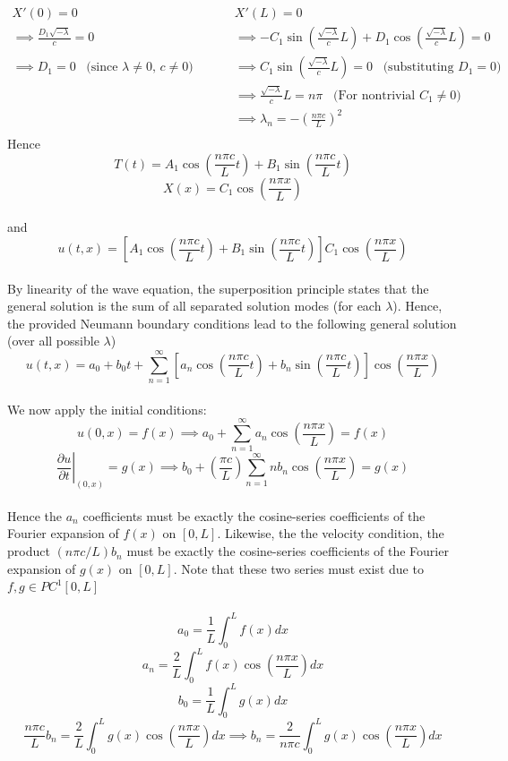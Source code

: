 \documentclass[12pt]{article}
\begin{document}
{\begin{align*}
X'(0) = 0 \;\;\;\;\;\;\;\;\;& X'(L) = 0 \\
\implies \frac{D_1 \sqrt{-\lambda}}{c} = 0\;\;\;\;\;\;\;\;\;& \implies -C_1 \sin\left( \frac{\sqrt{-\lambda}}{c} L \right) + D_1 \cos \left( \frac{\sqrt{-\lambda}}{c} L \right) = 0\\
\implies D_1 = 0 \;\;\; \text{(since $\lambda \neq 0$, $c \neq 0$)}\;\;\;\;\;\;\;\;\;& \implies C_1 \sin\left( \frac{\sqrt{-\lambda}}{c} L \right) = 0 \;\;\; \text{(substituting $D_1 = 0$)}  \\
\;\;\;\;\;\;\;\;\;& \implies \frac{\sqrt{-\lambda}}{c} L = n\pi \;\;\; \text{(For nontrivial $C_1 \neq 0$)}  \\
\;\;\;\;\;\;\;\;\;& \implies \lambda_n = - \left( \frac{n\pi c}{L} \right) ^2 \\
\end{align*}
Hence $$T(t) = A_1 \cos \left( \frac{n\pi c}{L} t \right) + B_1 \sin \left( \frac{n \pi c}{L} t \right)$$
$$X(x) = C_1 \cos \left( \frac{n\pi x}{L} \right)$$ \\ and 
$$u(t,x) = \left[ A_1 \cos \left( \frac{n\pi c}{L} t \right) + B_1 \sin \left( \frac{n \pi c}{L} t \right) \right] C_1 \cos \left( \frac{n\pi x}{L} \right)$$ \\ 
By linearity of the wave equation, the superposition principle states that the general solution is the sum of all separated solution modes (for each $\lambda$). Hence, the provided Neumann boundary conditions lead to the following general solution (over all possible $\lambda$)\\
$$\boxed{u(t,x) = a_0 + b_0 t + \sum_{n=1}^{\infty} \left[ a_n \cos \left( \frac{n\pi c}{L} t \right) + b_n \sin \left( \frac{n \pi c}{L} t \right) \right]  \cos \left( \frac{n\pi x}{L} \right)} $$ \\
We now apply the initial conditions:
$$u(0,x) = f(x) \implies  a_0  + \sum_{n=1}^{\infty} a_n \cos \left( \frac{n\pi x}{L} \right) = f(x)$$
$$\left. \frac{\partial u}{\partial t} \right|_{(0,x)}  = g(x) \implies b_0  + \left( \frac{\pi c}{L} \right) \sum_{n=1}^{\infty} n b_n  \cos \left( \frac{n\pi x}{L} \right) = g(x)$$ \\
Hence the $a_n$ coefficients must be exactly the cosine-series coefficients of the Fourier expansion of $f(x)$ on $[0,L]$. Likewise, the the velocity condition, the product $(n\pi c / L) b_n$ must be exactly the cosine-series coefficients of the Fourier expansion of $g(x)$ on $[0,L]$. Note that these two series must exist due to $f,g \in PC^1[0,L]$\\ \\
$$\boxed{a_0 = \frac{1}{L} \int_{0}^{L} f(x) dx}$$
$$\boxed{a_n = \frac{2}{L} \int_{0}^{L} f(x) \cos \left( \frac{n\pi x}{L} \right) dx}$$
$$\boxed{b_0 = \frac{1}{L} \int_{0}^{L} g(x) dx}$$
$$\frac{n\pi c}{L} b_n = \frac{2}{L} \int_{0}^{L} g(x) \cos \left( \frac{n\pi x}{L} \right) dx \implies \boxed{b_n = \frac{2}{n\pi c} \int_{0}^{L} g(x) \cos \left( \frac{n\pi x}{L} \right) dx}$$ \\
}
\end{document}
